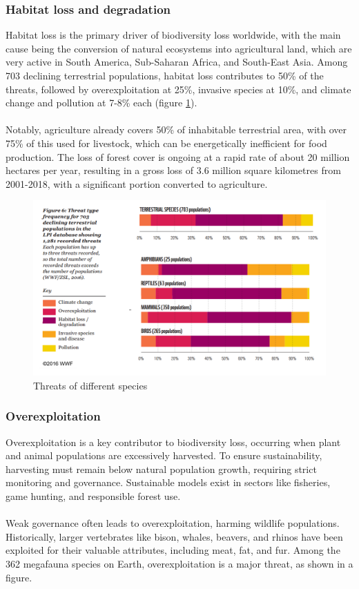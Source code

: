 \documentclass[../summary.tex]{subfiles}
\begin{document}
\subsubsection{Habitat loss and degradation}

Habitat loss is the primary driver of biodiversity loss worldwide, with the main cause being the conversion of natural ecosystems into agricultural land, which are very active in South America, Sub-Saharan Africa, and South-East Asia. Among 703 declining terrestrial populations, habitat loss contributes to 50\% of the threats, followed by overexploitation at 25\%, invasive species at 10\%, and climate change and pollution at 7-8\% each (figure \ref{fig:biodiversitythreats}).\\
\\
Notably, agriculture already covers 50\% of inhabitable terrestrial area, with over 75\% of this used for livestock, which can be energetically inefficient for food production. The loss of forest cover is ongoing at a rapid rate of about 20 million hectares per year, resulting in a gross loss of 3.6 million square kilometres from 2001-2018, with a significant portion converted to agriculture.

\begin{figure}[H]
	\centering
	\includegraphics[width=0.65\linewidth]{../images/Biodiversity_threats}
	\caption{Threats of different species}
	\label{fig:biodiversitythreats}
\end{figure}

\subsubsection{Overexploitation}

Overexploitation is a key contributor to biodiversity loss, occurring when plant and animal populations are excessively harvested. To ensure sustainability, harvesting must remain below natural population growth, requiring strict monitoring and governance. Sustainable models exist in sectors like fisheries, game hunting, and responsible forest use.\\
\\
Weak governance often leads to overexploitation, harming wildlife populations. Historically, larger vertebrates like bison, whales, beavers, and rhinos have been exploited for their valuable attributes, including meat, fat, and fur. Among the 362 megafauna species on Earth, overexploitation is a major threat, as shown in a figure.
\end{document}
